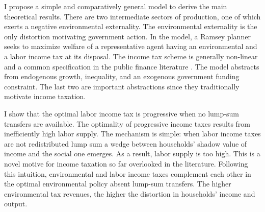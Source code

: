 I propose a simple and comparatively general model to derive the main theoretical results. There are two intermediate sectors of production, one of which exerts a negative environmental externality. The environmental externality is the only distortion motivating government action. In the model, a Ramsey planner seeks to maximize welfare of a representative agent having  an environmental and a labor income tax at its disposal. The income tax scheme is generally non-linear and a common specification in the public finance literature \citep[e.g.][]{Benabou2002TaxEfficiency, Heathcote2017OptimalFramework}.
The model abstracts from  endogenous growth, inequality, and an exogenous government funding constraint. The last two are important abstractions since they traditionally motivate income taxation.

I show that the optimal labor income tax is progressive when no lump-sum transfers are available. 
The optimality of progressive income taxes results from inefficiently high labor supply. The mechanism is simple: when labor income taxes are not redistributed lump sum a wedge between households' shadow value of income and the social one emerges.  As a result, labor supply is too high. 
This is a novel motive for income taxation so far overlooked in the literature.
Following this intuition, environmental and labor income taxes complement each other in the optimal environmental policy absent lump-sum transfers. The higher environmental tax revenues, the higher the distortion in households' income and output. 
  
